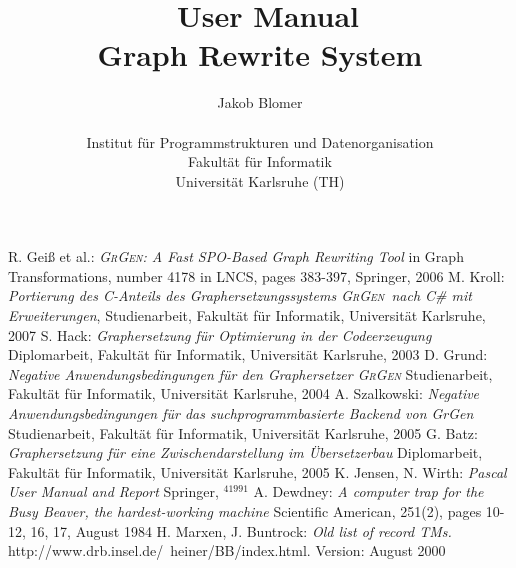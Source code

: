 \documentclass[a4paper,11pt]{report}
\title{\GrG\ User Manual \\ Graph Rewrite System}
\author{Jakob Blomer \\ \\ Institut für Programmstrukturen und Datenorganisation\\
Fakultät für Informatik\\
Universität Karlsruhe (TH)}
\providecommand{\GrG}{{\scshape GrGen}}
\begin{document}
\maketitle

\tableofcontents













 R. Geiß et al.: \emph{\GrG: A Fast SPO-Based Graph Rewriting Tool} in Graph Transformations, number 4178 in LNCS, pages 383-397, Springer, 2006
 M. Kroll: \emph{Portierung des C-Anteils des Graphersetzungssystems \GrG\ nach C\# mit Erweiterungen}, Studienarbeit, Fakultät für Informatik, Universität Karlsruhe, 2007
 S. Hack: \emph{Graphersetzung für Optimierung in der Codeerzeugung} Diplomarbeit, Fakultät für Informatik, Universität Karlsruhe, 2003
 D. Grund: \emph{Negative Anwendungsbedingungen für den Graphersetzer \GrG} Studienarbeit, Fakultät für Informatik, Universität Karlsruhe, 2004 
 A. Szalkowski: \emph{Negative Anwendungsbedingungen für das suchprogrammbasierte Backend von GrGen} Studienarbeit, Fakultät für Informatik, Universität Karlsruhe, 2005
 G. Batz: \emph{Graphersetzung für eine Zwischendarstellung im Übersetzerbau} Diplomarbeit, Fakultät für Informatik, Universität Karlsruhe, 2005
 K. Jensen, N. Wirth: \emph{Pascal User Manual and Report} Springer, $^41991$
 A. Dewdney: \emph{A computer trap for the Busy Beaver, the hardest-working machine} Scientific American, 251(2), pages 10-12, 16, 17, August 1984
 H. Marxen, J. Buntrock: \emph{Old list of record TMs.}\\ http://www.drb.insel.de/~heiner/BB/index.html. Version: August 2000
\end{document}
